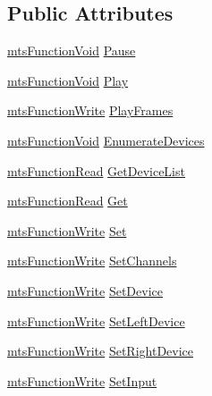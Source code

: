 \subsection*{Public Attributes}
\begin{DoxyCompactItemize}
\item 
\hyperlink{classmts_function_void}{mts\+Function\+Void} \hyperlink{class_i_req_filter_source_video_capture_a073a0413b996e5d4d245461e076e3795}{Pause}
\item 
\hyperlink{classmts_function_void}{mts\+Function\+Void} \hyperlink{class_i_req_filter_source_video_capture_a2a5cbec2e700b42d9881a46ffaf22386}{Play}
\item 
\hyperlink{classmts_function_write}{mts\+Function\+Write} \hyperlink{class_i_req_filter_source_video_capture_a79b1131e86440f72689500c70fa6da2b}{Play\+Frames}
\item 
\hyperlink{classmts_function_void}{mts\+Function\+Void} \hyperlink{class_i_req_filter_source_video_capture_abc59889de1d32b2fe8ba4398588314d2}{Enumerate\+Devices}
\item 
\hyperlink{classmts_function_read}{mts\+Function\+Read} \hyperlink{class_i_req_filter_source_video_capture_a317e649c1acbd6bdeec62893e7ae3c40}{Get\+Device\+List}
\item 
\hyperlink{classmts_function_read}{mts\+Function\+Read} \hyperlink{class_i_req_filter_source_video_capture_a6692ac9a41d34e0ec4cb17dbd8302ac3}{Get}
\item 
\hyperlink{classmts_function_write}{mts\+Function\+Write} \hyperlink{class_i_req_filter_source_video_capture_a39d844ff80462e2b32968766010a22e4}{Set}
\item 
\hyperlink{classmts_function_write}{mts\+Function\+Write} \hyperlink{class_i_req_filter_source_video_capture_a108e41051db33f291542ec5275406561}{Set\+Channels}
\item 
\hyperlink{classmts_function_write}{mts\+Function\+Write} \hyperlink{class_i_req_filter_source_video_capture_a29ecf8df8a2b5905824e12b826fdd45c}{Set\+Device}
\item 
\hyperlink{classmts_function_write}{mts\+Function\+Write} \hyperlink{class_i_req_filter_source_video_capture_abb04c8aec2b24d2e8e9cb8325e9dc156}{Set\+Left\+Device}
\item 
\hyperlink{classmts_function_write}{mts\+Function\+Write} \hyperlink{class_i_req_filter_source_video_capture_a0e43451e18521c96cc53ac0034717e7e}{Set\+Right\+Device}
\item 
\hyperlink{classmts_function_write}{mts\+Function\+Write} \hyperlink{class_i_req_filter_source_video_capture_a89b90330287cf606ddd78da6e3ff99ac}{Set\+Input}

\end{DoxyCompactItemize}
